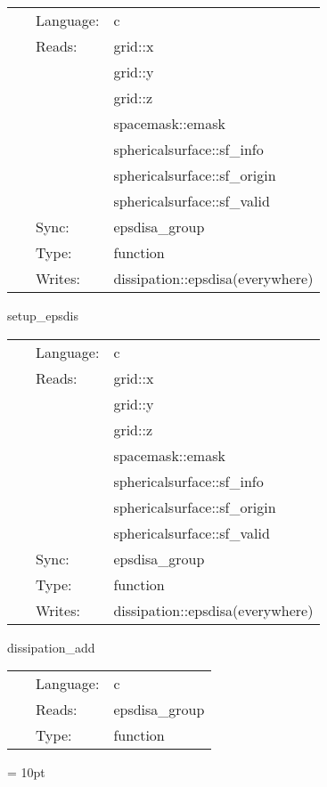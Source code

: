 \hspace{5mm}

 \begin{tabular*}{160mm}{cll} 
~ & Language:  & c \\ 
~ & Reads:  & grid::x \\ 
~& ~ &grid::y\\ 
~& ~ &grid::z\\ 
~& ~ &spacemask::emask\\ 
~& ~ &sphericalsurface::sf\_info\\ 
~& ~ &sphericalsurface::sf\_origin\\ 
~& ~ &sphericalsurface::sf\_valid\\ 
~ & Sync:  & epsdisa\_group \\ 
~ & Type:  & function \\ 
~ & Writes:  & dissipation::epsdisa(everywhere) \\ 
\end{tabular*} 


\vspace{5mm}


\hspace{5mm} setup\_epsdis 

\hspace{5mm}{\it setup spatially varying dissipation } 


\hspace{5mm}

 \begin{tabular*}{160mm}{cll} 
~ & Language:  & c \\ 
~ & Reads:  & grid::x \\ 
~& ~ &grid::y\\ 
~& ~ &grid::z\\ 
~& ~ &spacemask::emask\\ 
~& ~ &sphericalsurface::sf\_info\\ 
~& ~ &sphericalsurface::sf\_origin\\ 
~& ~ &sphericalsurface::sf\_valid\\ 
~ & Sync:  & epsdisa\_group \\ 
~ & Type:  & function \\ 
~ & Writes:  & dissipation::epsdisa(everywhere) \\ 
\end{tabular*} 


\vspace{5mm}


\hspace{5mm} dissipation\_add 

\hspace{5mm}{\it add kreiss-oliger dissipation to the right hand sides } 


\hspace{5mm}

 \begin{tabular*}{160mm}{cll} 
~ & Language:  & c \\ 
~ & Reads:  & epsdisa\_group \\ 
~ & Type:  & function \\ 
\end{tabular*} 



\vspace{5mm}\parskip = 10pt 
